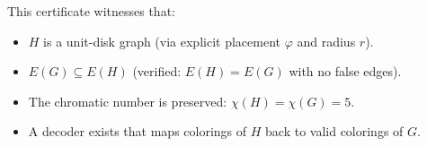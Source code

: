 \documentclass[11pt]{article}
\theoremstyle{definition}
\begin{document}
This certificate witnesses that:
\begin{itemize}
  \item $H$ is a unit-disk graph (via explicit placement $\varphi$ and radius $r$).
  \item $E(G) \subseteq E(H)$ (verified: $E(H) = E(G)$ with no false edges).
  \item The chromatic number is preserved: $\chi(H) = \chi(G) = 5$.
  \item A decoder exists that maps colorings of $H$ back to valid colorings of $G$.
\end{itemize}
\end{document}
